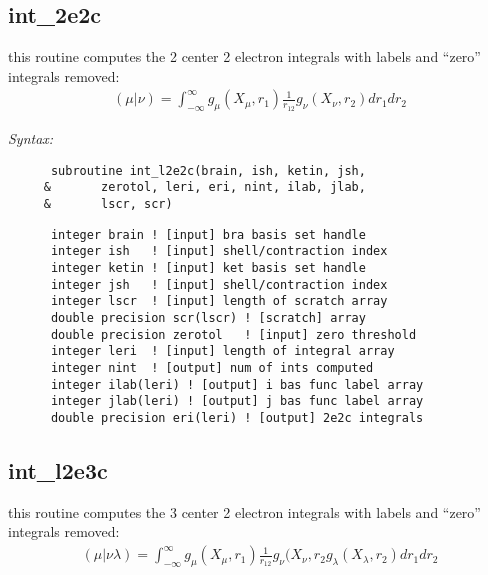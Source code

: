 \subsection{int\_2e2c} 
this routine computes the 2 center 2 electron integrals 
with labels and ``zero'' integrals removed:  
\begin{eqnarray*} 
({\mu}|{\nu}) = \int_{-\infty}^{\infty} g_{\mu}(X_{\mu},r_{1})\frac{1}{r_{12}}g_{\nu}(X_{\nu},r_{2})dr_{1}dr_{2} 
\end{eqnarray*} 
 
{\it Syntax:} 
\begin{verbatim} 
      subroutine int_l2e2c(brain, ish, ketin, jsh,  
     &       zerotol, leri, eri, nint, ilab, jlab,  
     &       lscr, scr) 
\end{verbatim} 
\begin{verbatim} 
      integer brain ! [input] bra basis set handle 
      integer ish   ! [input] shell/contraction index 
      integer ketin ! [input] ket basis set handle 
      integer jsh   ! [input] shell/contraction index 
      integer lscr  ! [input] length of scratch array 
      double precision scr(lscr) ! [scratch] array 
      double precision zerotol   ! [input] zero threshold 
      integer leri  ! [input] length of integral array 
      integer nint  ! [output] num of ints computed 
      integer ilab(leri) ! [output] i bas func label array 
      integer jlab(leri) ! [output] j bas func label array 
      double precision eri(leri) ! [output] 2e2c integrals 
\end{verbatim} 
\subsection{int\_l2e3c} 
this routine computes the 3 center 2 electron integrals 
with labels and ``zero'' integrals removed:  
\begin{eqnarray*} 
({\mu}|{\nu}{\lambda}) = \int_{-\infty}^{\infty} g_{\mu}(X_{\mu},r_{1})\frac{1}{r_{12}} 
g_{\nu}(X_{\nu},r_{2}g_{\lambda}(X_{\lambda},r_{2})dr_{1}dr_{2} 
\end{eqnarray*} 
 
